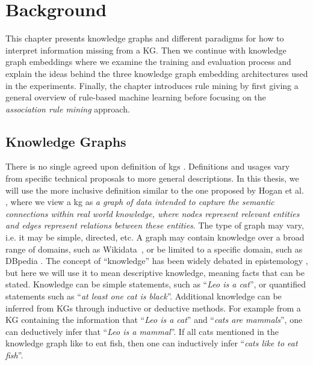 \chapter{Background}

This chapter presents knowledge graphs and different paradigms for how to interpret information missing from a KG. Then we continue with knowledge graph embeddings where we examine the training and evaluation process and explain the ideas behind the three knowledge graph embedding architectures used in the experiments. Finally, the chapter introduces rule mining by first giving a general overview of rule-based machine learning before focusing on the \textit{association rule mining} approach.

\section{Knowledge Graphs}
There is no single agreed upon definition of \glspl{kg} \cite{bergman_2019, bonatti2019knowledge, ehrlinger2016towards}. Definitions and usages vary from specific technical proposals to more general descriptions. In this thesis, we will use the more inclusive definition similar to the one proposed by Hogan et al. \cite{hogan2020knowledge}, where we view a \gls{kg} as \textit{a graph of data intended to capture the semantic connections within real world knowledge, where nodes represent relevant entities and edges represent relations between these entities}. The type of graph may vary, i.e. it may be simple, directed, etc. A graph may contain knowledge over a broad range of domains, such as Wikidata~\cite{lehmann2015dbpedia}, or be limited to a specific domain, such as DBpedia \cite{fellbaum2010wordnet}. The concept of ``knowledge'' has been widely debated in epistemology \cite{chappell2005plato, kirkham1984does, wittgenstein1969certainty, gottschalk2008internet}, but here we will use it to mean descriptive knowledge, meaning facts that can be stated. Knowledge can be simple statements, such as ``\textit{Leo is a cat}'', or quantified statements such as ``\textit{at least one cat is black}''. %
Additional knowledge can be inferred from KGs through inductive or deductive methods. For example from a KG containing the information that ``\textit{Leo is a cat}'' and ``\textit{cats are mammals}'', one can deductively infer that ``\textit{Leo is a mammal}''. If all cats mentioned in the knowledge graph like to eat fish, then one can inductively infer ``\textit{cats like to eat fish}''.

